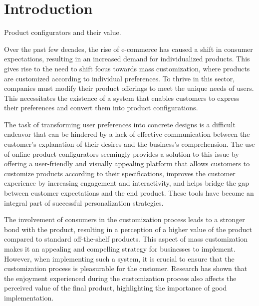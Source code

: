 \chapter*{Introduction}
\setcounter{page}{1}

\begin{chapterabstract}
Product configurators and their value.
\end{chapterabstract}

Over the past few decades, the rise of e-commerce has caused a shift in consumer expectations, resulting in an increased demand for individualized products. This gives rise to the need to shift focus towards mass customization, where products are customized according to individual preferences. To thrive in this sector, companies must modify their product offerings to meet the unique needs of users. This necessitates the existence of a system that enables customers to express their preferences and convert them into product configurations. \cite{Fulkerson2000}

The task of transforming user preferences into concrete designs is a difficult endeavor that can be hindered by a lack of effective communication between the customer's explanation of their desires and the business's comprehension. The use of online product configurators seemingly provides a solution to this issue by offering a user-friendly and visually appealing platform that allows customers to customize products according to their specifications, improves the customer experience by increasing engagement and interactivity, and helps bridge the gap between customer expectations and the end product. These tools have become an integral part of successful personalization strategies. \cite{Franke2003}

The involvement of consumers in the customization process leads to a stronger bond with the product, resulting in a perception of a higher value of the product compared to standard off-the-shelf products. This aspect of mass customization makes it an appealing and compelling strategy for businesses to implement. \cite{Schreier2006} However, when implementing such a system, it is crucial to ensure that the customization process is pleasurable for the customer. Research has shown that the enjoyment experienced during the customization process also affects the perceived value of the final product, highlighting the importance of good implementation. \cite{Franke2010}


